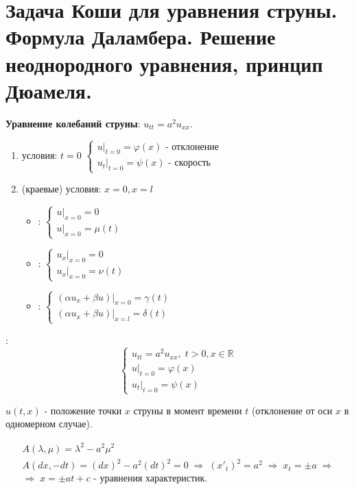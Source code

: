 \chapter{Задача Коши для уравнения струны. Формула Даламбера. Решение неоднородного уравнения, принцип Дюамеля.}
\label{cha:4}

\textbf{Уравнение колебаний струны}: $u_{tt} = a^2 u_{xx}$.

\begin{enumerate}
	\item {} условия: $t=0$
	$\begin{cases}
		u|_{t=0} = \varphi(x) \text{ - отклонение}\\
		u_t |_{t=0} = \psi(x) \text{ - скорость}
	\end{cases}$
	\item {} (краевые) условия: $x=0, x=l$
		\begin{itemize}
			\item[$\RNumb{1} \text{ рода}$]: $\begin{cases}
				u|_{x=0} = 0 \\
				u|_{x=0} = \mu(t)
			\end{cases}$
			\item[$\RNumb{2} \text{ рода}$]: $\begin{cases}
				{u_x}|_{x=0} = 0 \\
				{u_x}|_{x=0} = \nu(t)
			\end{cases}$
			\item[$\RNumb{3} \text{ рода}$]: $\begin{cases}
				(\alpha u_x + \beta u)|_{x=0} = \gamma(t) \\
				(\alpha u_x + \beta u)|_{x=l} = \delta(t)
			\end{cases}$
		\end{itemize}
\end{enumerate}

:
$$\begin{cases}
	u_{tt} = a^2 u_{xx}, \; t >0, x \in \mathbb{R} \\
	u|_{t=0} = \varphi (x)\\
	u_t |_{t=0} = \psi (x)
\end{cases}$$

$u (t,x)$ - положение точки $x$ струны в момент времени $t$ (отклонение от оси $x$ в одномерном случае).

$$\begin{gathered}
	A(\lambda, \mu) = \lambda^2 - a^2 \mu^2 \\
	A(dx, -dt) = (dx)^2 - a^2 (dt)^2 = 0 \; \Rightarrow \; (x'_t)^2 = a^2 \; \Rightarrow \; x_t = \pm a \; \Rightarrow \\
	\Rightarrow \; x = \pm a t +c \text{ - уравнения характеристик.}
\end{gathered}$$

